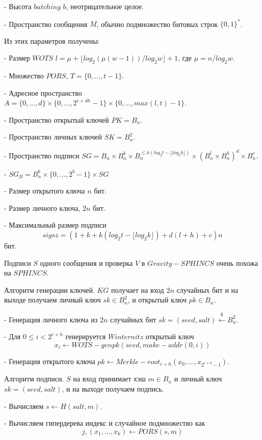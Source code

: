 \documentclass[a4paper, 14pt]{extarticle}
\begin{document}
- Высота $batching$ $b$, неотрицательное целое.

- Пространство сообщения $M$, обычно подмножество битовых строк $\{0,1\}^{*}$.

Из этих параметров получены:

- Размер $WOTS$ $l = \mu + \lfloor log_{2}(\mu(w - 1))/log_{2}w \rfloor + 1$, где $\mu = n/log_{2}w$.

- Множество $PORS$, $T = \{0, ..., t - 1\}$.

- Адресное пространство $A = \{0, ..., d\} \times \{0, ..., 2^{c + dh} - 1\} \times \{0, ..., max(l,t) - 1\}$.

- Пространство открытый ключей $PK = B_{n}$.

- Пространство личных ключей $SK = B^{2}_{n}$.

- Пространство подписи $SG = B_{n} \times B^{k}_{n} \times B^{\leq k(log_{2}t - \lfloor log_{2}k \rfloor)}_{n} \times (B^{l}_{n} \times B^{h}_{n})^{d} \times B^{c}_{n}$.

- $SG_{B} = B^{b}_{n} \times \{0, ..., 2^{b} - 1\} \times SG$

- Размер открытого ключа $n$ бит.

- Размер личного ключа, $2n$ бит.

- Максимальный размер подписи
\[sigsz = (1 + k +k(log_{2}t - \lfloor log_{2}k \rfloor) + d(l + h) + c)n\] бит.

Подписи $S$ одного сообщения и проверка $V$ в $Gravity-SPHINCS$ очень похожа на $SPHINCS$.

Алгоритм генерации ключей. $KG$ получает на вход $2n$ случайных бит и на выходе получаем личный ключ $sk \in B^{2}_{n}$, и открытый ключ $pk \in B_{n}$.

- Генерация личного ключа из $2n$ случайных бит $sk = (seed, salt) \stackrel{\$}{\leftarrow} B^{2}_{n}$.

- Для $0 \leq i < 2^{c+h}$ генерируется $Winternitz$ открытый ключ
\[x_{i} \leftarrow WOTS-genpk(seed, make-addr(0, i))\]

- Генерация открытого ключа $pk \leftarrow Merkle-root_{c+h}(x_{0}, ..., x_{2^{c+h} - 1})$.

Алгоритм подписи. $S$ на вход принимает хэш $m \in B_{n}$ и личный ключ $sk = (seed, salt)$, и на выходе получаем подпись.

- Вычисляем $s \leftarrow H(salt, m)$.

- Вычисляем гипердерева индекс и случайное подмножество как
\[j, (x_{1}, ..., x_{k}) \leftarrow PORS(s, m)\]
\end{document}
